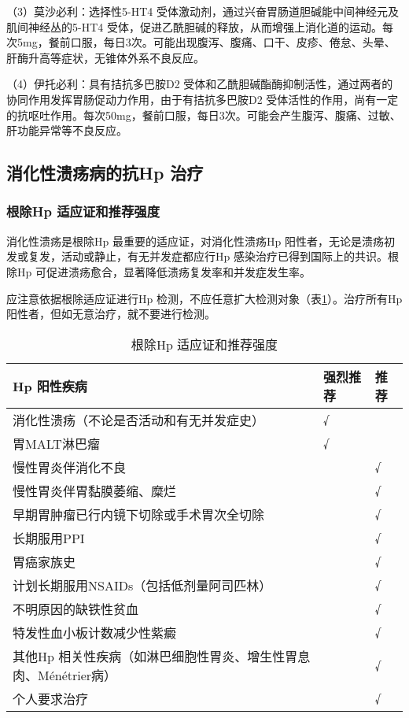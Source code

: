 （3）莫沙必利：选择性5-HT{4}
受体激动剂，通过兴奋胃肠道胆碱能中间神经元及肌间神经丛的5-HT{4}
受体，促进乙酰胆碱的释放，从而增强上消化道的运动。每次5mg，餐前口服，每日3次。可能出现腹泻、腹痛、口干、皮疹、倦怠、头晕、肝酶升高等症状，无锥体外系不良反应。

（4）伊托必利：具有拮抗多巴胺D{2}
受体和乙酰胆碱酯酶抑制活性，通过两者的协同作用发挥胃肠促动力作用，由于有拮抗多巴胺D{2}
受体活性的作用，尚有一定的抗呕吐作用。每次50mg，餐前口服，每日3次。可能会产生腹泻、腹痛、过敏、肝功能异常等不良反应。

\subsection{消化性溃疡病的抗Hp 治疗}

\subsubsection{根除Hp 适应证和推荐强度}

消化性溃疡是根除{Hp} 最重要的适应证，对消化性溃疡{Hp}
阳性者，无论是溃疡初发或复发，活动或静止，有无并发症都应行{Hp}
感染治疗已得到国际上的共识。根除{Hp}
可促进溃疡愈合，显著降低溃疡复发率和并发症发生率。

应注意依据根除适应证进行{Hp}
检测，不应任意扩大检测对象（表\ref{tab13-1}）。治疗所有{Hp}
阳性者，但如无意治疗，就不要进行检测。

\begin{longtable}[]{@{}lll@{}}
    \caption{根除{Hp} 适应证和推荐强度}
    \label{tab13-1}                                                                                     \\
    \toprule
    \endhead
    {Hp} 阳性疾病                                                      & 强烈推荐 & 推荐\tabularnewline
    \midrule
    消化性溃疡（不论是否活动和有无并发症史）                           & √        & \tabularnewline
    胃MALT淋巴瘤                                                       & √        & \tabularnewline
    慢性胃炎伴消化不良                                                 &          & √\tabularnewline
    慢性胃炎伴胃黏膜萎缩、糜烂                                         &          & √\tabularnewline
    早期胃肿瘤已行内镜下切除或手术胃次全切除                           &          & √\tabularnewline
    长期服用PPI                                                        &          & √\tabularnewline
    胃癌家族史                                                         &          & √\tabularnewline
    计划长期服用NSAIDs（包括低剂量阿司匹林）                           &          & √\tabularnewline
    不明原因的缺铁性贫血                                               &          & √\tabularnewline
    特发性血小板计数减少性紫癜                                         &          & √\tabularnewline
    其他{Hp} 相关性疾病（如淋巴细胞性胃炎、增生性胃息肉、Ménétrier病） &          &
    √\tabularnewline
    个人要求治疗                                                       &          & √\tabularnewline
    \bottomrule
\end{longtable}


